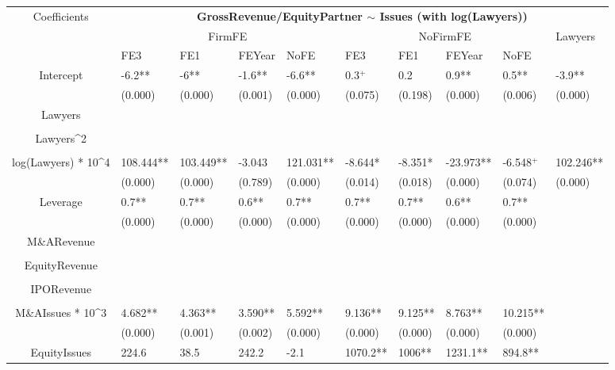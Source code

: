 \documentclass{article}
\begin{document}
\begin{table}[H]
\centering
\begin{tabular}{|clllllllll|}
\hline
\multirow{3}{*}{Coefficients} & \multicolumn{9}{c|}{\textbf{GrossRevenue/EquityPartner $\sim$ Issues (with log(Lawyers))}} \\
\cline{2-10}
& \multicolumn{4}{c}{FirmFE} & \multicolumn{4}{c}{NoFirmFE} & \multirow{2}{*}{Lawyers} \\
\cline{2-9}
& FE3 & FE1 & FEYear & NoFE & FE3 & FE1 & FEYear & NoFE &  \\
\hline
 
Intercept & -6.2** & -6** & -1.6** & -6.6** & 0.3$^{+}$ & 0.2 & 0.9** & 0.5** & -3.9** \\ 
   & (0.000) & (0.000) & (0.001) & (0.000) & (0.075) & (0.198) & (0.000) & (0.006) & (0.000) \\ 
  Lawyers &  &  &  &  &  &  &  &  &  \\ 
   &  &  &  &  &  &  &  &  &  \\ 
  Lawyers^2 &  &  &  &  &  &  &  &  &  \\ 
   &  &  &  &  &  &  &  &  &  \\ 
  log(Lawyers) * 10^4 & 108.444** & 103.449** & -3.043 & 121.031** & -8.644* & -8.351* & -23.973** & -6.548$^{+}$ & 102.246** \\ 
   & (0.000) & (0.000) & (0.789) & (0.000) & (0.014) & (0.018) & (0.000) & (0.074) & (0.000) \\ 
  Leverage & 0.7** & 0.7** & 0.6** & 0.7** & 0.7** & 0.7** & 0.6** & 0.7** &  \\ 
   & (0.000) & (0.000) & (0.000) & (0.000) & (0.000) & (0.000) & (0.000) & (0.000) &  \\ 
  M\&ARevenue &  &  &  &  &  &  &  &  &  \\ 
   &  &  &  &  &  &  &  &  &  \\ 
  EquityRevenue &  &  &  &  &  &  &  &  &  \\ 
   &  &  &  &  &  &  &  &  &  \\ 
  IPORevenue &  &  &  &  &  &  &  &  &  \\ 
   &  &  &  &  &  &  &  &  &  \\ 
  M\&AIssues * 10^3 & 4.682** & 4.363** & 3.590** & 5.592** & 9.136** & 9.125** & 8.763** & 10.215** &  \\ 
   & (0.000) & (0.001) & (0.002) & (0.000) & (0.000) & (0.000) & (0.000) & (0.000) &  \\ 
  EquityIssues & 224.6 & 38.5 & 242.2 & -2.1 & 1070.2** & 1006** & 1231.1** & 894.8** &  \\ 

\end{tabular}
\end{table}
\end{document}
